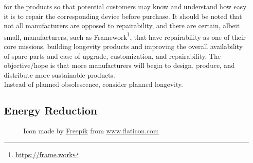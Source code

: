 for the products so that potential customers may know and understand how easy it
is to repair the corresponding device before purchase. It should be noted that
not all manufacturers are opposed to repairability, and there are certain,
albeit small, manufacturers, such as Framework\footnote{\url{https://frame.work}},
that have repairability as one of their core missions, building longevity
products and improving the overall availability of spare parts and ease of
upgrade, customization, and repairability. The objective/hope is that more manufacturers
will begin to design, produce, and distribute more sustainable products. \\ %
Instead of planned obsolescence, consider planned longevity.

\subsection{Energy Reduction}
\label{subsec:introduction_principles_energy_reduction}

\begin{figure} %
  \centering
  \def\stackalignment{l} %
  {\scriptsize \parbox[t]{\linewidth}{ Icon made by \href{https://www.flaticon.com/authors/freepik}{Freepik} from \href{http://www.flaticon.com}{www.flaticon.com} }}
\end{figure}

